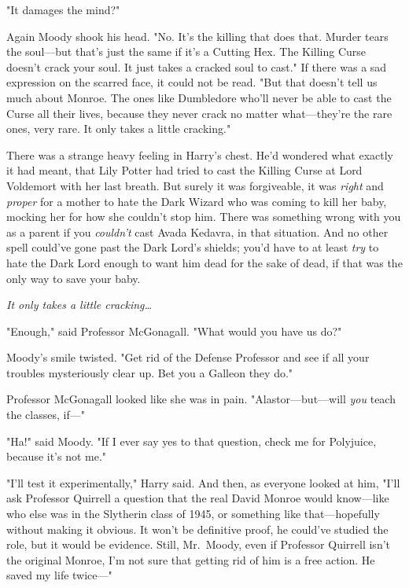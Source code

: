 "It damages the mind?"

Again Moody shook his head. "No. It's the killing that does that. Murder tears 
the soul---but that's just the same if it's a Cutting Hex. The Killing Curse 
doesn't crack your soul. It just takes a cracked soul to cast." If there was a 
sad expression on the scarred face, it could not be read. "But that doesn't 
tell us much about Monroe. The ones like Dumbledore who'll never be able to 
cast the Curse all their lives, because they never crack no matter 
what---they're the rare ones, very rare. It only takes a little cracking."

There was a strange heavy feeling in Harry's chest. He'd wondered what exactly 
it had meant, that Lily Potter had tried to cast the Killing Curse at Lord 
Voldemort with her last breath. But surely it was forgiveable, it was 
\emph{right} and\emph{ proper} for a mother to hate the Dark Wizard who was 
coming to kill her baby, mocking her for how she couldn't stop him. There was 
something wrong with you as a parent if you \emph{couldn't} cast Avada Kedavra, 
in that situation. And no other spell could've gone past the Dark Lord's 
shields; you'd have to at least \emph{try} to hate the Dark Lord enough to want 
him dead for the sake of dead, if that was the only way to save your baby.

\emph{It only takes a little cracking{\ldots}}

"Enough," said Professor McGonagall. "What would you have us do?"

Moody's smile twisted. "Get rid of the Defense Professor and see if all your 
troubles mysteriously clear up. Bet you a Galleon they do."

Professor McGonagall looked like she was in pain. "Alastor---but---will 
\emph{you} teach the classes, if---"

"Ha!" said Moody. "If I ever say yes to that question, check me for Polyjuice, 
because it's not me."

"I'll test it experimentally," Harry said. And then, as everyone looked at him, 
"I'll ask Professor Quirrell a question that the real David Monroe would 
know---like who else was in the Slytherin class of 1945, or something like 
that---hopefully without making it obvious. It won't be definitive proof, he 
could've studied the role, but it would be evidence. Still, Mr.~Moody, even if 
Professor Quirrell isn't the original Monroe, I'm not sure that getting rid of 
him is a free action. He saved my life twice---"

